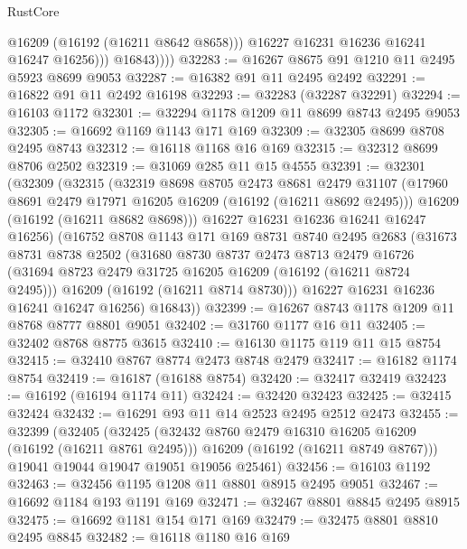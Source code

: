 \begin{lexlean}{RustCore}
\begin{coremodule}
                    @16209
                    (@16192 (@16211 @8642 @8658)))
                  @16227
                  @16231
                  @16236
                  @16241
                  @16247
                  @16256)))
            @16843))))
@32283 := @16267 @8675 @91 @1210 @11 @2495 @5923 @8699 @9053
@32287 := @16382 @91 @11 @2495 @2492
@32291 := @16822 @91 @11 @2492 @16198
@32293 := @32283 (@32287 @32291)
@32294 := @16103 @1172
@32301 := @32294 @1178 @1209 @11 @8699 @8743 @2495 @9053
@32305 := @16692 @1169 @1143 @171 @169
@32309 := @32305 @8699 @8708 @2495 @8743
@32312 := @16118 @1168 @16 @169
@32315 := @32312 @8699 @8706 @2502
@32319 := @31069 @285 @11 @15 @4555
@32391 := @32301
    (@32309
      (@32315
        (@32319
          @8698
          @8705
          @2473
          @8681
          @2479
          @31107
          (@17960 @8691 @2479 @17971 @16205 @16209 (@16192 (@16211 @8692 @2495)))
          @16209
          (@16192 (@16211 @8682 @8698)))
        @16227
        @16231
        @16236
        @16241
        @16247
        @16256)
      (@16752
        @8708
        @1143
        @171
        @169
        @8731
        @8740
        @2495
        @2683
        (@31673
          @8731
          @8738
          @2502
          (@31680
            @8730
            @8737
            @2473
            @8713
            @2479
            @16726
            (@31694 @8723 @2479 @31725 @16205 @16209 (@16192 (@16211 @8724 @2495)))
            @16209
            (@16192 (@16211 @8714 @8730)))
          @16227
          @16231
          @16236
          @16241
          @16247
          @16256)
        @16843))
@32399 := @16267 @8743 @1178 @1209 @11 @8768 @8777 @8801 @9051
@32402 := @31760 @1177 @16 @11
@32405 := @32402 @8768 @8775 @3615
@32410 := @16130 @1175 @119 @11 @15 @8754
@32415 := @32410 @8767 @8774 @2473 @8748 @2479
@32417 := @16182 @1174 @8754
@32419 := @16187 (@16188 @8754)
@32420 := @32417 @32419
@32423 := @16192 (@16194 @1174 @11)
@32424 := @32420 @32423
@32425 := @32415 @32424
@32432 := @16291 @93 @11 @14 @2523 @2495 @2512 @2473
@32455 := @32399
    (@32405
      (@32425
        (@32432 @8760 @2479 @16310 @16205 @16209 (@16192 (@16211 @8761 @2495)))
        @16209
        (@16192 (@16211 @8749 @8767)))
      @19041
      @19044
      @19047
      @19051
      @19056
      @25461)
@32456 := @16103 @1192
@32463 := @32456 @1195 @1208 @11 @8801 @8915 @2495 @9051
@32467 := @16692 @1184 @193 @1191 @169
@32471 := @32467 @8801 @8845 @2495 @8915
@32475 := @16692 @1181 @154 @171 @169
@32479 := @32475 @8801 @8810 @2495 @8845
@32482 := @16118 @1180 @16 @169

\end{coremodule}
\end{lexlean}

